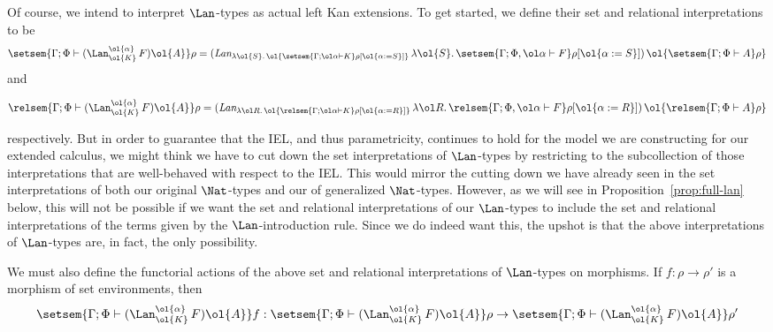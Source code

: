 \documentclass{lmcs}
\theoremstyle{plain}\newtheorem{satz}[thm]{Satz}
\begin{document}
Of course, we intend to interpret $\Lan$-types as actual left Kan
extensions. To get started, we define their set and relational
interpretations to be
\[
  \setsem{\Gamma;\Phi \vdash
    (\Lan^{\ol{\alpha}}_{\ol{K}}\,F)\ol{A}}\rho = (
  \textit{Lan}_{\lambda \ol{S}.\,\ol{\setsem{\Gamma; \ol\alpha \vdash K}
      \rho[\ol{\alpha := S}]}}\, \lambda \ol{S}.\,\setsem{\Gamma; \Phi, \ol\alpha
    \vdash F} \rho[\ol{\alpha := S}])\, \ol{\setsem{\Gamma; \Phi
      \vdash A}\rho}
\]
and 

\vspace*{-0.1in}

\[
  \relsem{\Gamma;\Phi \vdash
    (\Lan^{\ol{\alpha}}_{\ol{K}}\,F)\ol{A}}\rho = (
  \textit{Lan}_{\lambda \ol R.\,\ol{\relsem{\Gamma; \ol\alpha \vdash
        K}\rho[\ol{\alpha := R}]}}\, \lambda \ol R.\,\relsem{\Gamma;
    \Phi, \ol\alpha \vdash F}\rho[\ol{\alpha := R}])\,
  \ol{\relsem{\Gamma; \Phi \vdash A}\rho}
\]

\vspace*{0.05in}

\noindent
respectively. But in order to guarantee that the IEL, and thus
parametricity, continues to hold for the model we are constructing for
our extended calculus, we might think we have to cut down the set
interpretations of $\Lan$-types by restricting to the subcollection of
those interpretations that are well-behaved with respect to the
IEL. This would mirror the cutting down we have already seen in the
set interpretations of both our original $\Nat$-types and our of
generalized $\Nat$-types. However, as we will see in
Proposition~\ref{prop:full-lan} below, this will not be possible if we
want the set and relational interpretations of our $\Lan$-types to
include the set and relational interpretations of the terms given by
the $\Lan$-introduction rule. Since we do indeed want this, the upshot
is that the above interpretations of $\Lan$-types are, in fact, the
only possibility.

We must also define the functorial actions of the above set and
relational interpretations of $\Lan$-types on morphisms. If $f : \rho
\to \rho'$ is a morphism of set environments, then
\[
\setsem{\Gamma;\Phi \vdash (\Lan^{\ol{\alpha}}_{\ol{K}}\,F)\ol{A}}f
: \setsem{\Gamma;\Phi \vdash (\Lan^{\ol{\alpha}}_{\ol{K}}\,F)\ol{A}}\rho
\to \setsem{\Gamma;\Phi \vdash (\Lan^{\ol{\alpha}}_{\ol{K}}\,F)\ol{A}}\rho'
\]

\vspace*{0.05in}
\end{document}
